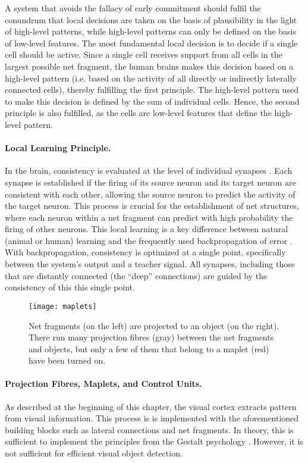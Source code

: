 A system that avoids the fallacy of early commitment should fulfil the conundrum that local decisions are taken on the basis of plausibility in the light of high-level patterns, while high-level patterns can only be defined on the basis of low-level features.
The most fundamental local decision is to decide if a single cell should be active. Since a single cell receives support from all cells in the largest possible net fragment,
the human brains makes this decision based on a high-level pattern (i.e. based on the activity of all directly or indirectly laterally connected cells), thereby fulfilling the first principle. The high-level pattern used to make this decision is defined by the sum of individual cells. Hence, the second principle is also fulfilled, as the cells are low-level features that define the high-level pattern.

\paragraph{Local Learning Principle.} In the brain, consistency is evaluated at the level of individual synapses . Each synapse is established if the firing of its source neuron and its target neuron are consistent with each other, allowing the source neuron to predict the activity of the target neuron. This process is crucial for the establishment of net structures, where each neuron within a net fragment can predict with high probability the firing of other neurons.
This local learning is a key difference between natural (animal or human) learning and the frequently used backpropagation of error . With backpropagation, consistency is optimized at a single point, specifically between the system's output and a teacher signal. All synapses, including those that are distantly connected (the ``deep'' connections) are guided by the consistency of this this single point.

\begin{figure}[h]
    \centering
    \texttt{[image: maplets]}
    \caption[An active maplet mapping net fragments to object prototypes]{Net fragments (on the left) are projected to an object (on the right). There run many projection fibres (gray) between the net fragments and objects, but only a few of them that belong to a maplet (red) have been turned on.}
\end{figure}
\paragraph{Projection Fibres, Maplets, and Control Units.} As described at the beginning of this chapter, the visual cortex extracts pattern from visual information. This process is is implemented with the aforementioned building blocks such as lateral connections and net fragments. In theory, this is sufficient to implement the principles from the Gestalt psychology . However, it is not sufficient for efficient visual object detection.

